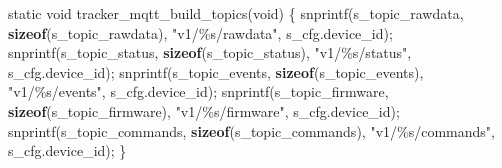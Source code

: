 \documentclass[13pt,a4paper]{extarticle}
\newenvironment{Shaded}{}{}
\newcommand{\DataTypeTok}[1]{\textcolor[rgb]{0.56,0.13,0.00}{#1}}
\newcommand{\KeywordTok}[1]{\textcolor[rgb]{0.00,0.44,0.13}{\textbf{#1}}}
\newcommand{\NormalTok}[1]{#1}
\newcommand{\OperatorTok}[1]{\textcolor[rgb]{0.40,0.40,0.40}{#1}}
\newcommand{\SpecialCharTok}[1]{\textcolor[rgb]{0.25,0.44,0.63}{#1}}
\newcommand{\StringTok}[1]{\textcolor[rgb]{0.25,0.44,0.63}{#1}}
\renewcommand{\\}{\thesislongtableorignewline\hline}%
\begin{document}
\begin{Shaded}
\begin{Highlighting}[]
\DataTypeTok{static} \DataTypeTok{void}\NormalTok{ tracker\_mqtt\_build\_topics}\OperatorTok{(}\DataTypeTok{void}\OperatorTok{)} \OperatorTok{\{}
\NormalTok{    snprintf}\OperatorTok{(}\NormalTok{s\_topic\_rawdata}\OperatorTok{,} \KeywordTok{sizeof}\OperatorTok{(}\NormalTok{s\_topic\_rawdata}\OperatorTok{),} \StringTok{"v1/}\SpecialCharTok{\%s}\StringTok{/rawdata"}\OperatorTok{,}\NormalTok{ s\_cfg}\OperatorTok{.}\NormalTok{device\_id}\OperatorTok{);}
\NormalTok{    snprintf}\OperatorTok{(}\NormalTok{s\_topic\_status}\OperatorTok{,} \KeywordTok{sizeof}\OperatorTok{(}\NormalTok{s\_topic\_status}\OperatorTok{),} \StringTok{"v1/}\SpecialCharTok{\%s}\StringTok{/status"}\OperatorTok{,}\NormalTok{ s\_cfg}\OperatorTok{.}\NormalTok{device\_id}\OperatorTok{);}
\NormalTok{    snprintf}\OperatorTok{(}\NormalTok{s\_topic\_events}\OperatorTok{,} \KeywordTok{sizeof}\OperatorTok{(}\NormalTok{s\_topic\_events}\OperatorTok{),} \StringTok{"v1/}\SpecialCharTok{\%s}\StringTok{/events"}\OperatorTok{,}\NormalTok{ s\_cfg}\OperatorTok{.}\NormalTok{device\_id}\OperatorTok{);}
\NormalTok{    snprintf}\OperatorTok{(}\NormalTok{s\_topic\_firmware}\OperatorTok{,} \KeywordTok{sizeof}\OperatorTok{(}\NormalTok{s\_topic\_firmware}\OperatorTok{),} \StringTok{"v1/}\SpecialCharTok{\%s}\StringTok{/firmware"}\OperatorTok{,}\NormalTok{ s\_cfg}\OperatorTok{.}\NormalTok{device\_id}\OperatorTok{);}
\NormalTok{    snprintf}\OperatorTok{(}\NormalTok{s\_topic\_commands}\OperatorTok{,} \KeywordTok{sizeof}\OperatorTok{(}\NormalTok{s\_topic\_commands}\OperatorTok{),} \StringTok{"v1/}\SpecialCharTok{\%s}\StringTok{/commands"}\OperatorTok{,}\NormalTok{ s\_cfg}\OperatorTok{.}\NormalTok{device\_id}\OperatorTok{);}
\OperatorTok{\}}


\end{Highlighting}
\end{Shaded}
\end{document}
